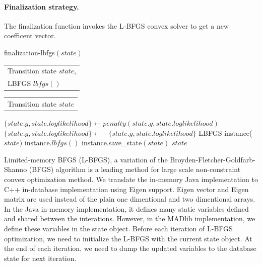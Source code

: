 \documentclass[11pt,letterpaper]{article}
\newlength{\alglabelwidth}
\newcommand{\alginput}[1]{%
\par\noindent%
\settowidth{\alglabelwidth}{\emph{Output:}}%
\makebox[\alglabelwidth][l]{\emph{Input:}} \begin{tabular}[t]{l} #1 \end{tabular}}
\newcommand{\algoutput}[1]{%
\par\noindent%
\settowidth{\alglabelwidth}{\emph{Output:}}%
\makebox[\alglabelwidth][l]{\emph{Output:}} \begin{tabular}[t]{l} #1 \end{tabular}}
\begin{document}
\paragraph{Finalization strategy.}
The finalization function invokes the L-BFGS convex solver to get a new coefficent vector.\\
\begin{algorithm}
\caption{finalization-lbfgs$(state)$} \label{alg:CRF training}
\alginput{Transition state $state$,\\
LBFGS $\mathit{lbfgs}()$}
\algoutput{Transition state $state$}
\begin{algorithmic}[1]
        \State $\{state.g,state.loglikelihood\} \gets penalty(state.g,state.loglikelihood)$ 
        \State $\{state.g,state.loglikelihood\}\gets-\{state.g,state.loglikelihood\}$ 
        \State LBFGS instance($state)$ 
        \State instance.$lbfgs()$ 
        \State instance.save\_state$(state)$ 
        \State \Return $state$
\end{algorithmic}
\end{algorithm}

Limited-memory BFGS (L-BFGS), a variation of the Broyden-Fletcher-Goldfarb-Shanno (BFGS)
algorithm is a leading method for large scale non-constraint convex optimization method.
We translate the in-memory Java implementation to C++ in-database implementation using Eigen support.
Eigen vector and Eigen matrix are used instead of the plain one dimentional and two dimentional arrays.
In the Java in-memory implementation, it defines many static variables defined and shared between the interations.
However, in the MADlib implementation, we define these variables in the state object.
Before each iteration of L-BFGS optimization, we need to initialize the L-BFGS with the current state object. 
At the end of each iteration, we need to dump the updated variables to the database state for next iteration.
\end{document}

